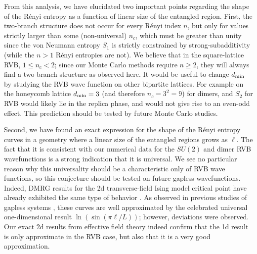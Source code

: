 \documentclass[11pt]{iopart}
\begin{document}
From this analysis, we have elucidated two important points regarding the shape of the R\'enyi entropy as a function of linear size of the entangled region.  
First, the two-branch structure does not occur for every R\'enyi index $n$, but only for values {strictly} larger than some (non-universal) $n_c$, which must be greater than unity since the von Neumann entropy $S_1$ is strictly constrained by strong-subadditivity (while the $n>1$ R\'enyi entropies are not).  We believe that in the square-lattice RVB, {$1\leq n_c<2$}; since our Monte Carlo methods require $n\ge 2$, they will always find a two-branch structure as observed here.  
It would be useful to change $d_{\rm min}$ by studying the RVB wave function on other bipartite lattices. For example on the honeycomb lattice $d_{\rm min}=3$ (and therefore $n_c=3^2=9$) for dimers, and $S_2$ for RVB would likely lie in the replica phase, {and would not give rise to an even-odd effect.} 
This prediction should be tested by future Monte Carlo studies.

Second, we have found an exact expression for the shape of the R\'enyi entropy curves in a geometry where a linear size of the entangled regions grows as {$\ell$}.  The fact that it is consistent with our numerical data for the $SU(2)$ and dimer RVB wavefunctions is a strong indication that  it is universal. We see no particular reason why this universality should be a characteristic only of RVB wave functions, so this conjecture should be tested on future gapless wavefunctions.  Indeed, DMRG results for the 2d transverse-field Ising model critical point have already exhibited the same type of behavior \cite{Konik}.
As observed in previous studies of gapless systems \cite{Ju2012}, these curves are well approximated by the celebrated universal one-dimensional result {$\ln(\sin(\pi \ell /L))$}; however, deviations were observed.  {Our exact 2d results from effective field theory indeed confirm that the 1d result is only approximate in the RVB case}, but also that it is a very good approximation.
\end{document}
